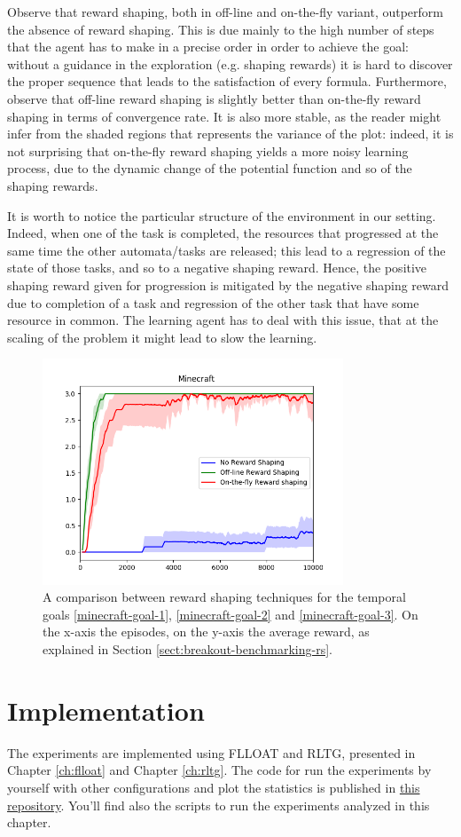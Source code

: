 Observe that reward shaping, both in off-line and on-the-fly variant, outperform the absence of reward shaping. This is due mainly to the high number of steps that the agent has to make in a precise order in order to achieve the goal: without a guidance in the exploration (e.g. shaping rewards) it is hard to discover the proper sequence that leads to the satisfaction of every formula. Furthermore, observe that off-line reward shaping is slightly better than on-the-fly reward shaping in terms of convergence rate. It is also more stable, as the reader might infer from the shaded regions that represents the variance of the plot: indeed, it is not surprising that on-the-fly reward shaping yields a more noisy learning process, due to the dynamic change of the potential function and so of the shaping rewards.

It is worth to notice the particular structure of the environment in our setting. Indeed, when one of the task is completed, the resources that progressed at the same time the other automata/tasks are released; this lead to a regression of the state of those tasks, and so to a negative shaping reward. Hence, the positive shaping reward given for progression is mitigated by the negative shaping reward due to completion of a task and regression of the other task that have some resource in common. The learning agent has to deal with this issue, that at the scaling of the problem it might lead to slow the learning.


\begin{figure}
	\centering
	\includegraphics[width=0.8\textwidth]{images/minecraft-comparison.png}
	\caption{A comparison between reward shaping techniques for the temporal goals \ref{minecraft-goal-1}, \ref{minecraft-goal-2} and \ref{minecraft-goal-3}. On the x-axis the episodes, on the y-axis the average reward, as explained in Section \ref{sect:breakout-benchmarking-rs}.}
	\label{fig:minecraft-comparison}
\end{figure}


\section{Implementation}
The experiments are implemented using FLLOAT and RLTG, presented in Chapter \ref{ch:flloat} and Chapter \ref{ch:rltg}.
The code for run the experiments by yourself with other configurations and plot the statistics is published in \href{https://github.com/MarcoFavorito/rltg-examples}{this repository}. You'll find also the scripts to run the experiments analyzed in this chapter.